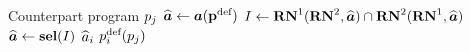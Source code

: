 \documentclass[sigconf]{aamas}
\newcommand{\selection}{sel}%
\newcommand{\renegb}{\mathbf{\selection}}
\theoremstyle{definition}
\begin{document}
\begin{algorithm}
\caption{
Conditional set-valued
renegotiation
program $\progi \in \fsspaceireni$, for some $\defprogi$}
\label{alg:csr}
\begin{algorithmic}[1]
\Require Counterpart program $p_j$
    \State 
    $\widehat{\boldsymbol{a}} \leftarrow \boldsymbol{a}({\textbf{p}}^{\textnormal{def}})$ 
        \State ${I} \leftarrow \mathbf{RN}^{1}(\mathbf{RN}^{2}, \widehat{\boldsymbol{a}}) \cap \mathbf{RN}^{2}(\mathbf{RN}^{1}, \widehat{\boldsymbol{a}})$
             \State $\deffullact \leftarrow \renegb({I})$%
    \EndIf
    \State \Return $\widehat{a}_i$
\Else
     \State \Return $p_i^{\textnormal{def}}(p_j)$  %
\EndIf
\end{algorithmic}
\end{algorithm}
\end{document}
